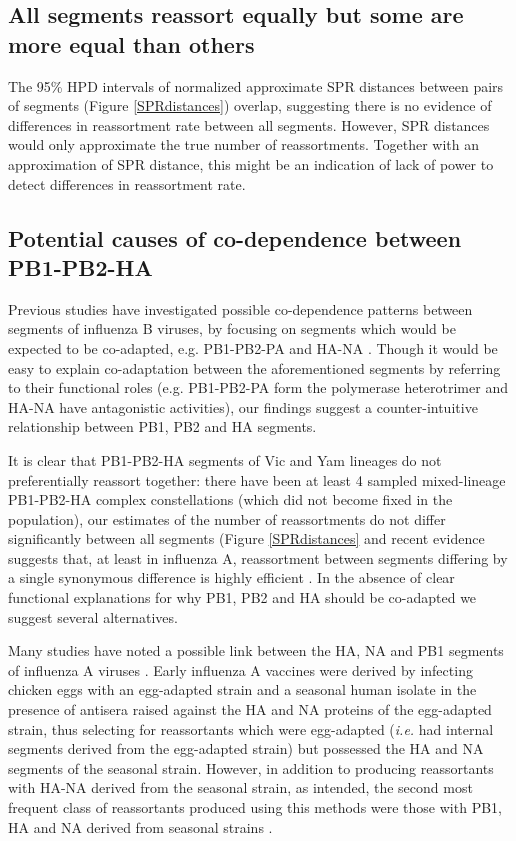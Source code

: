 \documentclass[11pt,oneside,letterpaper]{article}
\begin{document}
\subsection*{All segments reassort equally but some are more equal than others}
The 95\% HPD intervals of normalized approximate SPR distances between pairs of segments (Figure \ref{SPRdistances}) overlap, suggesting there is no evidence of differences in reassortment rate between all segments.
However, SPR distances would only approximate the true number of reassortments.
Together with an approximation of SPR distance, this might be an indication of lack of power to detect differences in reassortment rate.


\subsection*{Potential causes of co-dependence between PB1-PB2-HA}
Previous studies have investigated possible co-dependence patterns between segments of influenza B viruses, by focusing on segments which would be expected to be co-adapted, e.g. PB1-PB2-PA and HA-NA \cite{mccullers2004}.
Though it would be easy to explain co-adaptation between the aforementioned segments by referring to their functional roles (e.g. PB1-PB2-PA form the polymerase heterotrimer and HA-NA have antagonistic activities), our findings suggest a counter-intuitive relationship between PB1, PB2 and HA segments.

It is clear that PB1-PB2-HA segments of Vic and Yam lineages do not preferentially reassort together: there have been at least 4 sampled mixed-lineage PB1-PB2-HA complex constellations (which did not become fixed in the population), our estimates of the number of reassortments do not differ significantly between all segments (Figure \ref{SPRdistances} and recent evidence suggests that, at least in influenza A, reassortment between segments differing by a single synonymous difference is highly efficient \cite{marshall2013}.
In the absence of clear functional explanations for why PB1, PB2 and HA should be co-adapted we suggest several alternatives.

Many studies have noted a possible link between the HA, NA and PB1 segments of influenza A viruses \cite{bergeron2010,fulvini2011}.
Early influenza A vaccines were derived by infecting chicken eggs with an egg-adapted strain and a seasonal human isolate in the presence of antisera raised against the HA and NA proteins of the egg-adapted strain, thus selecting for reassortants which were egg-adapted (\textit{i.e.} had internal segments derived from the egg-adapted strain) but possessed the HA and NA segments of the seasonal strain.
However, in addition to producing reassortants with HA-NA derived from the seasonal strain, as intended, the second most frequent class of reassortants produced using this methods were those with PB1, HA and NA derived from seasonal strains \cite{bergeron2010,fulvini2011}.
\end{document}
